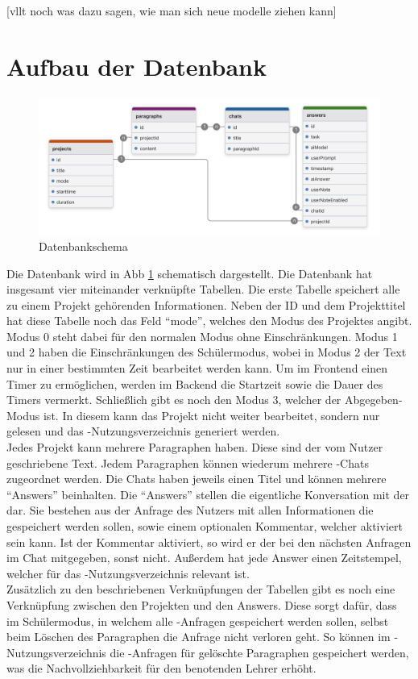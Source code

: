 \documentclass[../main.tex]{subfiles}
\begin{document}
[vllt noch was dazu sagen, wie man sich neue modelle ziehen kann]

\section{Aufbau der Datenbank}
\begin{figure}[h!]
  \includegraphics[scale=0.14]{bilder/Datenbank.png}
  \caption{Datenbankschema}
  \label{fig:data}
\end{figure}
Die Datenbank wird in Abb \ref{fig:data} schematisch dargestellt. Die Datenbank hat insgesamt vier miteinander verknüpfte Tabellen. Die erste Tabelle speichert alle zu einem Projekt gehörenden 
Informationen. Neben der ID und dem Projekttitel hat diese Tabelle noch das Feld "`mode"', welches den Modus des Projektes angibt. Modus 0 steht dabei für den normalen Modus ohne 
Einschränkungen. Modus 1 und 2 haben die Einschränkungen des Schülermodus, wobei in Modus 2 der Text nur in einer bestimmten Zeit bearbeitet werden kann. Um im Frontend einen Timer 
zu ermöglichen, werden im Backend die Startzeit sowie die Dauer des Timers vermerkt. Schließlich gibt es noch den Modus 3, welcher der Abgegeben-Modus ist. In diesem kann das Projekt 
nicht weiter bearbeitet, sondern nur gelesen und das -Nutzungsverzeichnis generiert werden.\\
Jedes Projekt kann mehrere Paragraphen haben. Diese sind der vom Nutzer geschriebene Text. Jedem Paragraphen können wiederum mehrere -Chats zugeordnet werden. Die Chats haben 
jeweils einen Titel und können mehrere "`Answers"' beinhalten. Die "`Answers"' stellen die eigentliche Konversation mit der  dar. Sie bestehen aus der Anfrage des Nutzers mit allen 
Informationen die gespeichert werden sollen, sowie einem optionalen Kommentar, welcher aktiviert sein kann. Ist der Kommentar aktiviert, so wird er der  bei den nächsten Anfragen 
im Chat mitgegeben, sonst nicht. Außerdem hat jede Answer einen Zeitstempel, welcher für das -Nutzungsverzeichnis relevant ist.\\
Zusätzlich zu den beschriebenen Verknüpfungen der Tabellen gibt es noch eine Verknüpfung zwischen den Projekten und den Answers. Diese sorgt dafür, dass im Schülermodus, in welchem 
alle -Anfragen gespeichert werden sollen, selbst beim Löschen des Paragraphen die Anfrage nicht verloren geht. So können im -Nutzungsverzeichnis die -Anfragen für gelöschte 
Paragraphen gespeichert werden, was die Nachvollziehbarkeit für den benotenden Lehrer erhöht.
\end{document}
